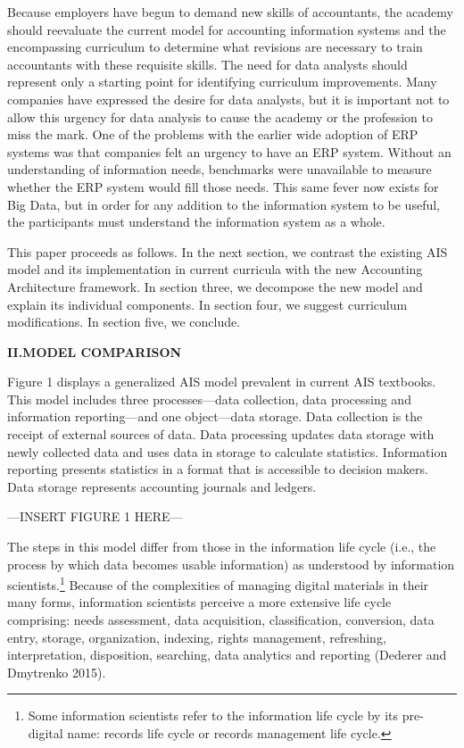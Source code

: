 \documentclass[12pt]{article}
\newcommand{\Section}[2]{\vspace{.2in}\centerline{\normalsize{}\textbf{#1\quad{}\MakeUppercase{#2}}}\nopagebreak{}\smallskip{}\indent{}}
\newcommand{\InsertGraphic}[1]{\vspace{.1in}\noindent{}\centerline{\MakeUppercase{---\quad{}Insert #1 here\quad{}---}}\vspace{.1in}}
\begin{document}
Because employers have begun to demand new skills of accountants, the academy should reevaluate the current model for accounting information systems and the encompassing curriculum to determine what revisions are necessary to train accountants with these requisite skills. The need for data analysts should represent only a starting point for identifying curriculum improvements. Many companies have expressed the desire for data analysts, but it is important not to allow this urgency for data analysis to cause the academy or the profession to miss the mark. One of the problems with the earlier wide adoption of ERP systems was that companies felt an urgency to have an ERP system. Without an understanding of information needs, benchmarks were unavailable to measure whether the ERP system would fill those needs. This same fever now exists for Big Data, but in order for any addition to the information system to be useful, the participants must understand the information system as a whole.

This paper proceeds as follows. In the next section, we contrast the existing AIS model and its implementation in current curricula with the new Accounting Architecture framework. In section three, we decompose the new model and explain its individual components. In section four, we suggest curriculum modifications. In section five, we conclude.

\Section{II.}{Model Comparison}
Figure 1 displays a generalized AIS model prevalent in current AIS textbooks. This model includes three processes---data collection, data processing and information reporting---and one object---data storage. Data collection is the receipt of external sources of data. Data processing updates data storage with newly collected data and uses data in storage to calculate statistics. Information reporting presents statistics in a format that is accessible to decision makers. Data storage represents accounting journals and ledgers.

\InsertGraphic{Figure 1}

The steps in this model differ from those in the information life cycle (i.e., the process by which data becomes usable information) as understood by information scientists.\footnote{Some information scientists refer to the information life cycle by its pre-digital name: records life cycle or records management life cycle.} Because of the complexities of managing digital materials in their many forms, information scientists perceive a more extensive life cycle comprising: needs assessment, data acquisition, classification, conversion, data entry, storage, organization, indexing, rights management, refreshing, interpretation, disposition, searching, data analytics and reporting (Dederer and Dmytrenko 2015).
\end{document}
